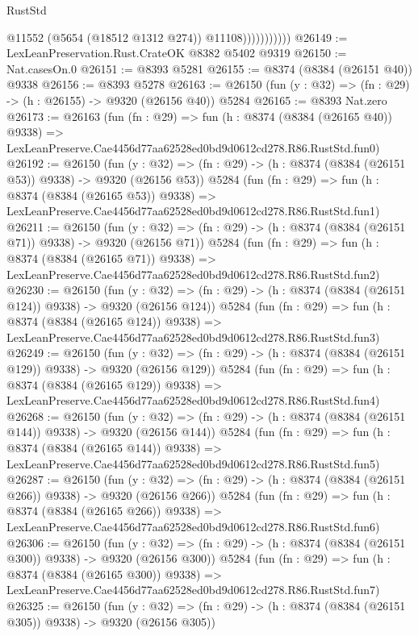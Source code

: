\begin{lexlean}{RustStd}
\begin{coremodule}
                          @11552
                          (@5654 (@18512 @1312 @274))
                          @11108)))))))))))
@26149 := LexLeanPreservation.Rust.CrateOK @8382 @5402 @9319
@26150 := Nat.casesOn.{0}
@26151 := @8393 @5281
@26155 := @8374 (@8384 (@26151 @40)) @9338
@26156 := @8393 @5278
@26163 := @26150 (fun (y : @32) => (fn : @29) -> (h : @26155) -> @9320 (@26156 @40)) @5284
@26165 := @8393 Nat.zero
@26173 := @26163
    (fun (fn : @29) =>
    fun (h : @8374 (@8384 (@26165 @40)) @9338) =>
    LexLeanPreserve.Cae4456d77aa62528ed0bd9d0612cd278.R86.RustStd.fun0)
@26192 := @26150
    (fun (y : @32) => (fn : @29) -> (h : @8374 (@8384 (@26151 @53)) @9338) -> @9320 (@26156 @53))
    @5284
    (fun (fn : @29) =>
    fun (h : @8374 (@8384 (@26165 @53)) @9338) =>
    LexLeanPreserve.Cae4456d77aa62528ed0bd9d0612cd278.R86.RustStd.fun1)
@26211 := @26150
    (fun (y : @32) => (fn : @29) -> (h : @8374 (@8384 (@26151 @71)) @9338) -> @9320 (@26156 @71))
    @5284
    (fun (fn : @29) =>
    fun (h : @8374 (@8384 (@26165 @71)) @9338) =>
    LexLeanPreserve.Cae4456d77aa62528ed0bd9d0612cd278.R86.RustStd.fun2)
@26230 := @26150
    (fun (y : @32) => (fn : @29) -> (h : @8374 (@8384 (@26151 @124)) @9338) -> @9320 (@26156 @124))
    @5284
    (fun (fn : @29) =>
    fun (h : @8374 (@8384 (@26165 @124)) @9338) =>
    LexLeanPreserve.Cae4456d77aa62528ed0bd9d0612cd278.R86.RustStd.fun3)
@26249 := @26150
    (fun (y : @32) => (fn : @29) -> (h : @8374 (@8384 (@26151 @129)) @9338) -> @9320 (@26156 @129))
    @5284
    (fun (fn : @29) =>
    fun (h : @8374 (@8384 (@26165 @129)) @9338) =>
    LexLeanPreserve.Cae4456d77aa62528ed0bd9d0612cd278.R86.RustStd.fun4)
@26268 := @26150
    (fun (y : @32) => (fn : @29) -> (h : @8374 (@8384 (@26151 @144)) @9338) -> @9320 (@26156 @144))
    @5284
    (fun (fn : @29) =>
    fun (h : @8374 (@8384 (@26165 @144)) @9338) =>
    LexLeanPreserve.Cae4456d77aa62528ed0bd9d0612cd278.R86.RustStd.fun5)
@26287 := @26150
    (fun (y : @32) => (fn : @29) -> (h : @8374 (@8384 (@26151 @266)) @9338) -> @9320 (@26156 @266))
    @5284
    (fun (fn : @29) =>
    fun (h : @8374 (@8384 (@26165 @266)) @9338) =>
    LexLeanPreserve.Cae4456d77aa62528ed0bd9d0612cd278.R86.RustStd.fun6)
@26306 := @26150
    (fun (y : @32) => (fn : @29) -> (h : @8374 (@8384 (@26151 @300)) @9338) -> @9320 (@26156 @300))
    @5284
    (fun (fn : @29) =>
    fun (h : @8374 (@8384 (@26165 @300)) @9338) =>
    LexLeanPreserve.Cae4456d77aa62528ed0bd9d0612cd278.R86.RustStd.fun7)
@26325 := @26150
    (fun (y : @32) => (fn : @29) -> (h : @8374 (@8384 (@26151 @305)) @9338) -> @9320 (@26156 @305))

\end{coremodule}
\end{lexlean}
